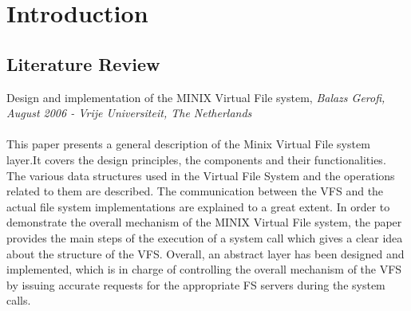 \chapter{Introduction}

\section{Literature Review}
\vspace{10mm}
 Design and implementation of the MINIX Virtual File system, { \em Balazs Gerofi, August 2006 - Vrije Universiteit, The Netherlands
}\cite{chdos}
\\
\\
This paper presents a general description of the Minix Virtual File system layer.It covers the design principles, the components and their functionalities.
The various data structures used in the Virtual File System and the operations related to them are described. The communication between the VFS and the actual file system implementations are explained to a great extent.
In order to demonstrate the overall mechanism of the MINIX Virtual File system, the paper provides the main steps of the execution of a system call which gives a clear idea about the structure of the VFS.
Overall, an abstract layer has been designed and implemented, which is in charge of controlling the overall mechanism of the VFS by issuing accurate requests for the appropriate FS servers during the system calls.





